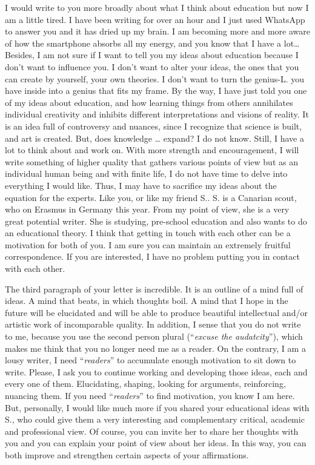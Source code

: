 \documentclass[]{book}
\begin{document}
I would write to you more broadly about what I think about education but now I am a little tired. I have been writing for over an hour and I just used WhatsApp to answer you and it has dried up my brain. I am becoming more and more aware of how the smartphone absorbs all my energy, and you know that I have a lot\ldots{} Besides, I am not sure if I want to tell you my ideas about education because I don't want to influence you. I don't want to alter your ideas, the ones that you can create by yourself, your own theories. I don't want to turn the genius-L. you have inside into a genius that fits my frame. By the way, I have just told you one of my ideas about education, and how learning things from others annihilates individual creativity and inhibits different interpretations and visions of reality. It is an idea full of controversy and nuances, since I recognize that science is built, and art is created. But, does knowledge \ldots{} expand? I do not know. Still, I have a lot to think about and work on. With more strength and encouragement, I will write something of higher quality that gathers various points of view but as an individual human being and with finite life, I do not have time to delve into everything I would like. Thus, I may have to sacrifice my ideas about the equation for the experts. Like you, or like my friend S.. S. is a Canarian scout, who on Erasmus in Germany this year. From my point of view, she is a very great potential writer. She is studying, pre-school education and also wants to do an educational theory. I think that getting in touch with each other can be a motivation for both of you. I am sure you can maintain an extremely fruitful correspondence. If you are interested, I have no problem putting you in contact with each other.

The third paragraph of your letter is incredible. It is an outline of a mind full of ideas. A mind that beats, in which thoughts boil. A mind that I hope in the future will be elucidated and will be able to produce beautiful intellectual and/or artistic work of incomparable quality. In addition, I sense that you do not write to me, because you use the second person plural (``\emph{excuse the audatcity}''), which makes me think that you no longer need me as a reader. On the contrary, I am a lousy writer, I need ``\emph{readers}'' to accumulate enough motivation to sit down to write. Please, I ask you to continue working and developing those ideas, each and every one of them. Elucidating, shaping, looking for arguments, reinforcing, nuancing them. If you need ``\emph{readers}'' to find motivation, you know I am here. But, personally, I would like much more if you shared your educational ideas with S., who could give them a very interesting and complementary critical, academic and professional view. Of course, you can invite her to share her thoughts with you and you can explain your point of view about her ideas. In this way, you can both improve and strengthen certain aspects of your affirmations.
\end{document}
